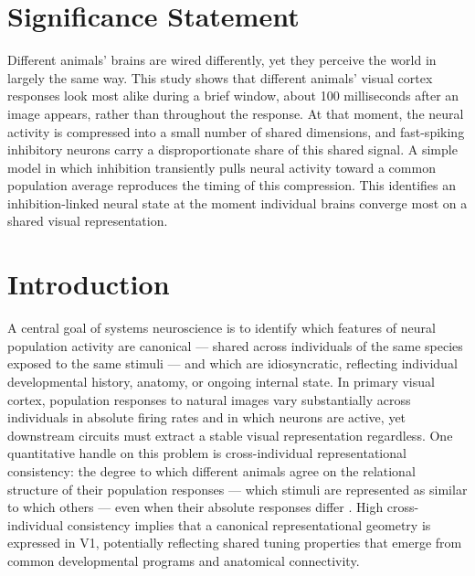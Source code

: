 \documentclass[11pt,onecolumn]{article}
\begin{document}
\section*{Significance Statement}

Different animals' brains are wired differently, yet they perceive
the world in largely the same way. This study shows that different 
animals' visual cortex responses look most alike during a brief window, 
about 100 milliseconds after an image appears, rather than throughout 
the response. At that moment, the neural activity is compressed into 
a small number of shared dimensions, and fast-spiking inhibitory neurons 
carry a disproportionate share of this shared signal. A
simple model in which inhibition transiently pulls neural activity toward
a common population average reproduces the timing of this compression.
This identifies an inhibition-linked neural state at the moment 
individual brains converge most on a shared visual representation.

\newpage

\section{Introduction}

A central goal of systems neuroscience is to identify which features of
neural population activity are canonical --- shared across individuals of
the same species exposed to the same stimuli --- and which are
idiosyncratic, reflecting individual developmental history, anatomy, or
ongoing internal state. In primary visual cortex, population responses
to natural images vary substantially across individuals in absolute firing
rates and in which neurons are active, yet downstream circuits must extract
a stable visual representation regardless. One quantitative handle on this
problem is cross-individual representational consistency: the degree to
which different animals agree on the relational structure of their
population responses --- which stimuli are represented as similar to which
others --- even when their absolute responses differ
\citep{kriegeskorte2008}. High cross-individual consistency implies that a
canonical representational geometry is expressed in V1, potentially
reflecting shared tuning properties that emerge from common developmental
programs and anatomical connectivity.
\end{document}
